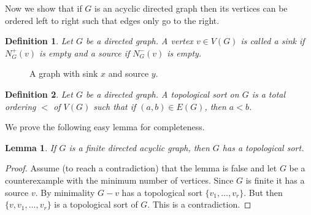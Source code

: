 \documentclass[12pt]{kluwer}
\newtheorem{lem}[thm]{Lemma}
\newtheorem{defn}{Definition}
\theoremstyle{remark}
\begin{document}
Now we show that if $G$ is an acyclic directed graph then its vertices can be ordered left to right such that edges only go to the right.  

\begin{defn}
Let $G$ be a directed graph.  A vertex $v \in V(G)$ is called a \emph{sink} if $N^+_G(v)$ is empty and a \emph{source} if $N^-_G(v)$ is empty.
\end{defn}

\begin{figure}[h]
\centering
{}
\caption{A graph with sink $x$ and source $y$.}
\end{figure}

\begin{defn}
Let $G$ be a directed graph.  A \emph{topological sort} on $G$ is a total ordering $<$ of $V(G)$ such that if $(a,b) \in E(G)$, then $a < b$.
\end{defn}

We prove the following easy lemma for completeness.
\begin{lem}
If $G$ is a finite directed acyclic graph, then $G$ has a topological sort.
\end{lem}
\begin{proof}
Assume (to reach a contradiction) that the lemma is false and let $G$ be a counterexample with the minimum number of vertices.  Since $G$ is finite it has a source $v$.  By minimality $G - v$ has a topological sort $\{v_1, \ldots, v_r\}$.  But then $\{v, v_1, \ldots, v_r\}$ is a topological sort of $G$. This is a contradiction.
\end{proof}
\end{document}
